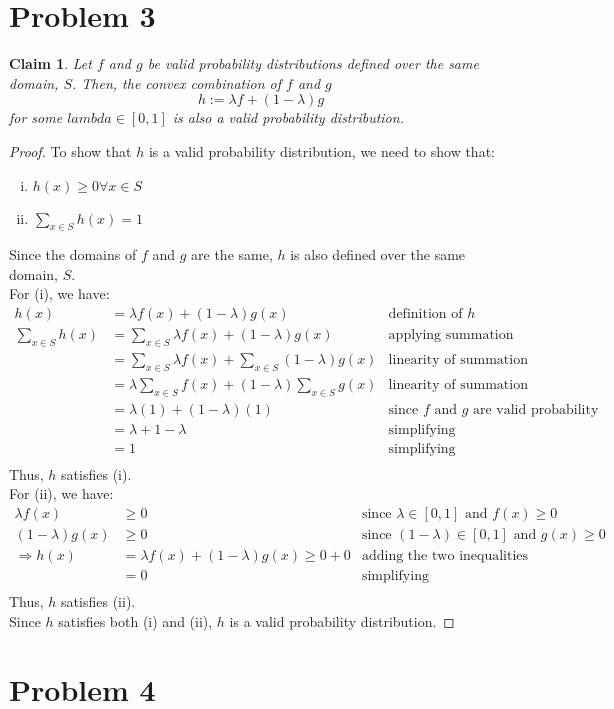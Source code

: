 \documentclass[11pt]{article}
\newtheorem*{claim}{Claim}
\begin{document}
\newpage

\section*{Problem 3}
\begin{claim}
	Let $f$ and $g$ be valid probability distributions defined over the same domain, $S$.
	Then, the convex combination of $f$ and $g$
	\[
		h := \lambda f + (1 - \lambda) g
	\]
	for some $lambda \in [0, 1]$ is also a valid probability distribution.
\end{claim}
\begin{proof}
	To show that $h$ is a valid probability distribution, we need to show that:
	\begin{enumerate}[(i)]
		\item $h(x) \geq 0 \forall x \in S$
		\item $\sum_{x \in S} h(x) = 1$
	\end{enumerate}
	Since the domains of $f$ and $g$ are the same, $h$ is also defined over the same domain, $S$. \\
	For (i), we have:
	\begin{align*}
		h(x) &= \lambda f(x) + (1 - \lambda) g(x) & \text{definition of } h \\
		\sum_{x \in S} h(x) &= \sum_{x \in S} \lambda f(x) + (1 - \lambda) g(x) & \text{applying summation} \\
		&= \sum_{x \in S} \lambda f(x) + \sum_{x \in S} (1 - \lambda) g(x) & \text{linearity of summation} \\
		&= \lambda \sum_{x \in S} f(x) + (1 - \lambda) \sum_{x \in S} g(x) & \text{linearity of summation} \\
		&= \lambda (1) + (1 - \lambda) (1) & \text{since } f \text{ and } g \text{ are valid probability distributions} \\
		&= \lambda + 1 - \lambda & \text{simplifying} \\
		&= 1 & \text{simplifying} \\
	\end{align*}
	Thus, $h$ satisfies (i). \\
	For (ii), we have:
	\begin{align*}
		\lambda f(x) & \geq 0 & \text{since } \lambda \in [0, 1] \text{ and } f(x) \geq 0 \\
		(1 - \lambda) g(x) & \geq 0 & \text{since } (1 - \lambda) \in [0, 1] \text{ and } g(x) \geq 0 \\
		\Rightarrow h(x) &= \lambda f(x) + (1 - \lambda) g(x) \geq 0 + 0 & \text{adding the two inequalities} \\
		&= 0 & \text{simplifying} \\
	\end{align*}
	Thus, $h$ satisfies (ii). \\
	Since $h$ satisfies both (i) and (ii), $h$ is a valid probability distribution.
\end{proof}

\newpage

\section*{Problem 4}
\end{document}
